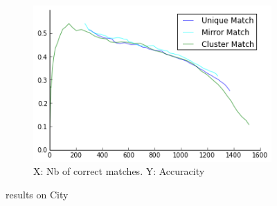 \documentclass{article}
\begin{document}
\begin{figure}
{\begin{subfigure}[t]{0.35\textwidth}
			\label{fig:city2}
		\end{subfigure}%
		~ %
		\begin{subfigure}[t]{0.35\textwidth}
			\centering
			\includegraphics[width=\textwidth]{images/result_banksy_city}
			\caption{X: Nb of correct matches. Y: Accuracity}
			\label{fig:result_city}
		\end{subfigure}%
	}%
	\label{fig:city}
	\caption{results on City}
\end{figure}
\end{document}
